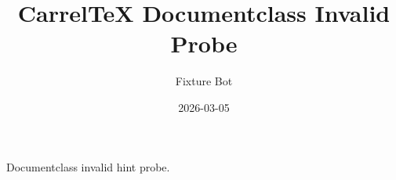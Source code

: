 \documentclass{../evil}
\title{CarrelTeX Documentclass Invalid Probe}
\author{Fixture Bot}
\date{2026-03-05}
\begin{document}
\maketitle

Documentclass invalid hint probe.
\end{document}
